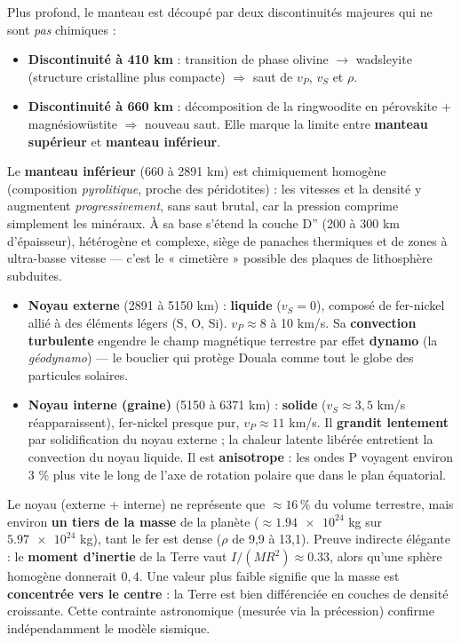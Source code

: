 \documentclass[11pt]{article}
\newcommand{\cle}[1]{{\popxbold\color{popdark}#1}}
\newcounter{popsec}
\newcounter{popsub}
\newcommand{\courssub}[1]{%
  \stepcounter{popsub}%
  \par\vspace{9pt}\noindent{\popxbold\fontsize{11.5}{13}\selectfont\color{popink}{\color{poporange}\thepopsec.\thepopsub}\hspace{6pt}#1}\par\nopagebreak\vspace{4pt}
}
\begin{document}
Plus profond, le manteau est découpé par deux discontinuités majeures qui ne sont \emph{pas} chimiques :

\begin{itemize}
\item \textbf{Discontinuité à 410 km} : transition de phase olivine $\to$ wadsleyite (structure cristalline plus compacte) $\Rightarrow$ saut de $v_P$, $v_S$ et $\rho$.
\item \textbf{Discontinuité à 660 km} : décomposition de la ringwoodite en pérovskite + magnésiowüstite $\Rightarrow$ nouveau saut. Elle marque la limite entre \textbf{manteau supérieur} et \textbf{manteau inférieur}.
\end{itemize}

Le \textbf{manteau inférieur} (660 à 2891 km) est chimiquement homogène (composition \emph{pyrolitique}, proche des péridotites) : les vitesses et la densité y augmentent \emph{progressivement}, sans saut brutal, car la pression comprime simplement les minéraux. À sa base s'étend la couche \cle{D''} (200 à 300 km d'épaisseur), hétérogène et complexe, siège de panaches thermiques et de zones à ultra-basse vitesse — c'est le « cimetière » possible des plaques de lithosphère subduites.

\courssub{Le noyau : cœur liquide et graine solide}

\begin{itemize}
\item \textbf{Noyau externe} (2891 à 5150 km) : \textbf{liquide} ($v_S = 0$), composé de fer-nickel allié à des éléments légers (S, O, Si). $v_P \approx 8$ à 10 km/s. Sa \textbf{convection turbulente} engendre le champ magnétique terrestre par effet \textbf{dynamo} (la \emph{géodynamo}) — le bouclier qui protège Douala comme tout le globe des particules solaires.
\item \textbf{Noyau interne (graine)} (5150 à 6371 km) : \textbf{solide} ($v_S \approx 3,5$ km/s réapparaissent), fer-nickel presque pur, $v_P \approx 11$ km/s. Il \textbf{grandit lentement} par solidification du noyau externe ; la chaleur latente libérée entretient la convection du noyau liquide. Il est \textbf{anisotrope} : les ondes P voyagent environ 3 \% plus vite le long de l'axe de rotation polaire que dans le plan équatorial.
\end{itemize}

\begin{exemplebox}
Le noyau (externe + interne) ne représente que $\approx 16\,\%$ du volume terrestre, mais environ \textbf{un tiers de la masse} de la planète ($\approx \num{1,94e24}$ kg sur $\num{5,97e24}$ kg), tant le fer est dense ($\rho$ de 9,9 à 13,1). Preuve indirecte élégante : le \textbf{moment d'inertie} de la Terre vaut $I/(MR^2) \approx \num{0,33}$, alors qu'une sphère homogène donnerait $0,4$. Une valeur plus faible signifie que la masse est \textbf{concentrée vers le centre} : la Terre est bien différenciée en couches de densité croissante. Cette contrainte astronomique (mesurée via la précession) confirme indépendamment le modèle sismique.
\end{exemplebox}
\end{document}
